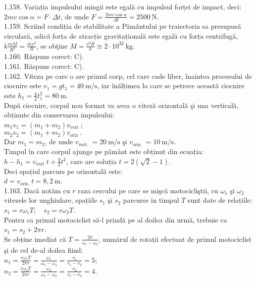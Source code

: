 1.158. Variația impulsului mingii este egală cu impulsul forței de impact, deci: $2 m v \cos \alpha=F \cdot \Delta t$, de unde $F=\frac{2 m v \cos \alpha}{\Delta t}=2500 \mathrm{~N}$.\\

1.159. Scriind condiția de stabilitate a Pământului pe traiectoria sa presupusă circulară, adică forța de atracție gravitațională este egală cu forța centrifugă, $k \frac{m M}{R^{2}}=\frac{m v^{2}}{R}$, se obţine $M=\frac{v^{2} R}{k} \cong 2 \cdot 10^{32} \mathrm{~kg}$.\\

1.160. Răspuns corect: C).\\

1.161. Răspuns corect: C).\\

1.162. Viteza pe care o are primul corp, cel care cade liber, înaintea procesului de ciocnire este $v_{1}=g t_{1}=40 \mathrm{~m} / \mathrm{s}$, iar înălțimea la care se petrece această ciocnire este $h_{1}=\frac{g}{2} t_{1}^{2}=80 \mathrm{~m}$.\\ După ciocnire, corpul nou format va avea o viteză orizontală şi una verticală, obținute din conservarea impulsului:\\ $m_{1} v_{1}=\left(m_{1}+m_{2}\right) v_{\text {vert }}$;\\ $m_{2} v_{2}=\left(m_{1}+m_{2}\right) v_{\text {oriz }}.$\\ Dar $m_{1}=m_{2}$, de unde $v_{\text {vert. }}=20 \mathrm{~m} / \mathrm{s}$ şi $v_{\text {oriz. }}=10 \mathrm{~m} / \mathrm{s}$.\\ Timpul în care corpul ajunge pe pământ este obținut din ecuația:\\ $h-h_{1}=v_{\text {vert }} t+\frac{g}{2} t^{2}$, care are soluția $t=2(\sqrt{2}-1)$.\\ Deci spațiul parcurs pe orizontală este:\\ $d=v_{\text {oriz. }} t=8,2 \mathrm{~m}$.\\

1.163. Dacă notăm cu $r$ raza cercului pe care se mişcă motocicliştii, cu $\omega_{1}$ şi $\omega_{2}$ vitezele lor unghiulare, spațiile $s_{1}$ şi $s_{2}$ parcurse in timpul $T$ sunt date de relațiile:\\ $s_{1}=r \omega_{1} T; \quad s_{2}=r \omega_{2} T$.\\ Pentru ca primul motociclist să-l prindă pe al doilea din urmă, trebuie ca $s_{1}=s_{2}+2 \pi r$.\\ Se obține imediat că $T=\frac{2 \pi}{\omega_{1}-\omega_{2}}$, numărul de rotații efectuat de primul motociclist şi de cel de-al doilea fiind:\\ $n_{1}=\frac{r \omega_{1} T}{2 \pi r}=\frac{\omega_{1}}{\omega_{1}-\omega_{2}}=\frac{v_{1}}{v_{1}-v_{2}}=5$;\\ $n_{2}=\frac{r \omega_{2} T}{2 \pi r}=\frac{\omega_{2}}{\omega_{1}-\omega_{2}}=\frac{v_{2}}{v_{1}-v_{2}}=4$.\\

